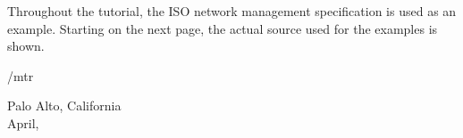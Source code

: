 Throughout the tutorial,
the ISO network management specification is used as an example.
Starting on the next page,
the actual source used for the examples is shown.

\vspace{0.25in}
{\raggedleft /mtr\par}
{\raggedright Palo Alto, California\\
April, {\oldstyle\number\year}\par}

\newpage
{}

\newpage
{}




